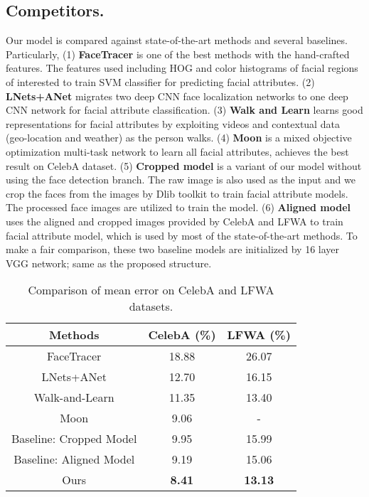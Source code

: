 \documentclass[10pt,twocolumn,letterpaper]{article}
\begin{document}
\subsection{Competitors. }

Our model is compared against state-of-the-art methods and several
baselines. 
Particularly, (1) \textbf{FaceTracer} \cite{kumar2008facetracer}
is one of the best methods with the hand-crafted features. The features
used including HOG \cite{PHOG2007CVIR} and color histograms of facial
regions of interested to train SVM classifier for predicting facial
attributes. (2)\textbf{ LNets+ANet} \cite{liu2015deep} migrates two
deep CNN face localization networks to one deep CNN network for facial
attribute classification. (3) \textbf{Walk and Learn} \cite{wang2016walk}
learns good representations for facial attributes by exploiting videos
and contextual data (geo-location and weather) as the person walks.
(4)\textbf{ Moon} \cite{rudd2016moon} is a mixed objective optimization
multi-task network to learn all facial attributes, achieves the best result
on CelebA dataset. (5) \textbf{Cropped model }is a variant of our
model without using the face detection branch. The raw image is also
used as the input and we crop the faces from the images by Dlib toolkit
to train facial attribute models. The processed face images are utilized
to train the model. (6)\textbf{ Aligned model} uses the aligned and cropped images provided
by CelebA and LFWA to train facial attribute model, which is used
by most of the state-of-the-art methods. To make a fair comparison, these
two baseline models are initialized by 16 layer VGG network; same
as the proposed structure.

\begin{table}
\centering{}%
\begin{tabular}{c|c|c}
\hline 
Methods  & CelebA (\%)  & LFWA (\%) \tabularnewline
\hline 
\hline 
FaceTracer \cite{kumar2008facetracer} &18.88 &26.07 \tabularnewline
\hline 
LNets+ANet \cite{liu2015deep}  &12.70 &16.15  \tabularnewline
\hline 
Walk-and-Learn \cite{wang2016walk} &11.35  &13.40 \tabularnewline
\hline 
Moon \cite{moon_attrb}  &9.06  & - \tabularnewline
\hline 
Baseline: Cropped Model  &9.95 &15.99   \tabularnewline
Baseline: Aligned Model   &9.19 &15.06  \tabularnewline
\hline
Ours &\textbf{8.41} & \textbf{13.13}   \tabularnewline
\hline 
\end{tabular}\caption{ \label{tab:Comparison-of-mean-error} Comparison of mean error
 on CelebA and LFWA datasets.}
\end{table}
\end{document}
